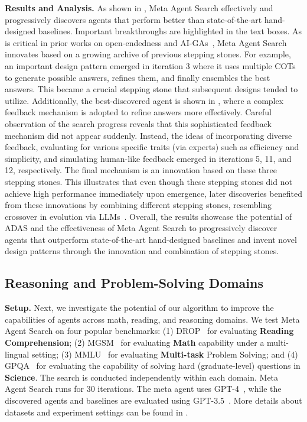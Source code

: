 \documentclass{article}
\newcommand{\problem}{ADAS\xspace}
\newcommand{\ouralgo}{Meta Agent Search\xspace}
\begin{document}
\noindent\textbf{Results and Analysis.}\hspace{0.5em} As shown in , \ouralgo effectively and progressively discovers agents that perform better than state-of-the-art hand-designed baselines.
Important breakthroughs are highlighted in the text boxes.
As is critical in prior works on open-endedness and AI-GAs~\citep{zhang2024omni,faldor2024omni,wang2019poet,wang2020enhanced,lehman2011abandoning}, \ouralgo innovates based on a growing archive of previous stepping stones.
For example, an important design pattern emerged in iteration 3 where it uses multiple COTs to generate possible answers, refines them, and finally ensembles the best answers.
This became a crucial stepping stone that subsequent designs tended to utilize.
Additionally, the best-discovered agent is shown in , where a complex feedback mechanism is adopted to refine answers more effectively.
Careful observation of the search progress reveals that this sophisticated feedback mechanism did not appear suddenly. 
Instead, the ideas of incorporating diverse feedback, evaluating for various specific traits (via experts) such as efficiency and simplicity, and simulating human-like feedback emerged in iterations 5, 11, and 12, respectively.
The final mechanism is an innovation based on these three stepping stones.
This illustrates that even though these stepping stones did not achieve high performance immediately upon emergence, later discoveries benefited from these innovations by combining different stepping stones, resembling crossover in evolution via LLMs~\citep{meyerson2023lmx}.
Overall, the results showcase the potential of \problem and the effectiveness of \ouralgo to progressively discover agents that outperform state-of-the-art hand-designed baselines and invent novel design patterns through the innovation and combination of stepping stones.

\subsection{Reasoning and Problem-Solving Domains}

\label{section:expr_four_main_domains}


\noindent\textbf{Setup.} \hspace{0.5em} Next, we investigate the potential of our algorithm to improve the capabilities of agents across math, reading, and reasoning domains. We test \ouralgo on four popular benchmarks: (1) DROP~\citep{dua-2019-drop} for evaluating \textbf{Reading Comprehension}; (2) MGSM~\citep{shi2023language} for evaluating \textbf{Math} capability under a multi-lingual setting; (3) MMLU~\citep{hendrycks2021mmlu} for evaluating \textbf{Multi-task} Problem Solving; and (4) GPQA~\citep{rein2023gpqa} for evaluating the capability of solving hard (graduate-level) questions in \textbf{Science}. The search is conducted independently within each domain. \ouralgo runs for 30 iterations. The meta agent uses GPT-4~\citep{openai2024gpt4}, while the discovered agents and baselines are evaluated using GPT-3.5~\citep{openai_gpt3.5}. More details about datasets and experiment settings can be found in .
\end{document}
